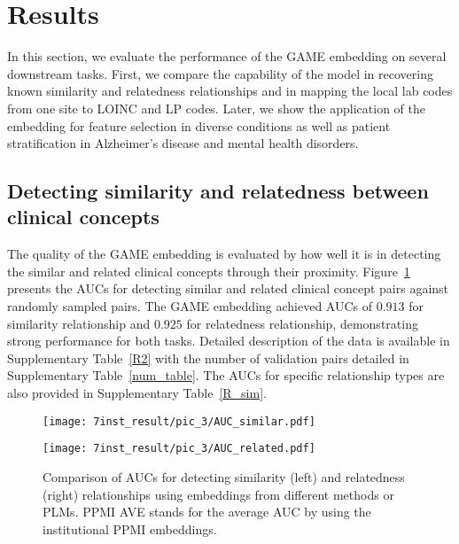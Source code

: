 \documentclass{article}
\begin{document}
\section{Results}
\label{sec:result}

In this section,
we evaluate the performance of the GAME embedding on several downstream tasks.
First, we compare the capability of the model in recovering known similarity and
relatedness relationships
and in mapping the local lab codes from one site to LOINC and LP codes.
Later, we show the application of the embedding for feature selection in diverse conditions as well as patient stratification in Alzheimer's disease and mental health disorders.

\subsection{Detecting similarity and relatedness between clinical concepts}

The quality of the GAME embedding is evaluated by how well it is
in detecting the similar and related clinical concepts through their proximity.
Figure~\ref{P2_AUC} presents the AUCs for detecting similar and related clinical concept pairs against randomly sampled pairs.
The GAME embedding achieved AUCs of $0.913$ for similarity relationship and $0.925$ for relatedness relationship,
demonstrating strong performance for both tasks.
Detailed description of the data is available in Supplementary Table~\ref{R2}
with the number of validation pairs detailed in Supplementary Table~\ref{num_table}.
The AUCs for specific relationship types are also provided in Supplementary Table~\ref{R_sim}.

\begin{figure}[!ht]
\centering
\begin{minipage}{.499\textwidth}       \centering
\texttt{[image: 7inst\_result/pic\_3/AUC\_similar.pdf]}
\end{minipage}%
\hfill
\begin{minipage}{.499\textwidth}
    \centering
    \texttt{[image: 7inst\_result/pic\_3/AUC\_related.pdf]}
\end{minipage}
\caption{ 
Comparison of AUCs for detecting similarity (left) and relatedness (right) relationships
using embeddings from different methods or PLMs.
PPMI AVE stands for the average AUC by using the institutional PPMI embeddings.
}
\label{P2_AUC}
\end{figure}
\end{document}
